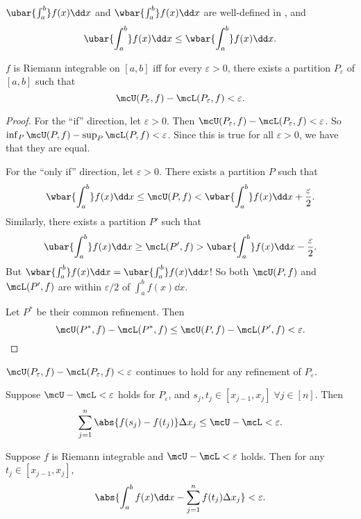 \begin{corollary}
    $\ubar{\int_a^b} f(x) \dd x$ and $\wbar{\int_a^b} f(x) \dd x$
    are well-defined in \R, and \[
        \ubar{\int_a^b} f(x) \dd x \le \wbar{\int_a^b} f(x) \dd x.
    \]
\end{corollary}

\begin{theorem*}
    $f$ is Riemann integrable on $[a, b]$ iff for every $\varepsilon > 0$,
    there exists a partition $P_\varepsilon$ of $[a, b]$ such that \[
        \mcU(P_\varepsilon, f) - \mcL(P_\varepsilon, f) < \varepsilon.
    \]
\end{theorem*}
\begin{proof}
    For the ``if'' direction, let $\varepsilon > 0$.
    Then $\mcU(P_\varepsilon, f) - \mcL(P_\varepsilon, f) < \varepsilon$.
    So $\inf_P \mcU(P, f) - \sup_P \mcL(P, f) < \varepsilon$.
    Since this is true for all $\varepsilon > 0$, we have that they are
    equal.

    For the ``only if'' direction, let $\varepsilon > 0$.
    There exists a partition $P$ such that \[
        \wbar{\int_a^b} f(x) \dd x
            \le \mcU(P, f)
            < \wbar{\int_a^b} f(x) \dd x + \frac{\varepsilon}{2}.
    \] Similarly, there exists a partition $P'$ such that \[
        \ubar{\int_a^b} f(x) \dd x
            \ge \mcL(P', f)
            > \ubar{\int_a^b} f(x) \dd x - \frac{\varepsilon}{2}.
    \] But $\wbar{\int_a^b} f(x) \dd x = \ubar{\int_a^b} f(x) \dd x$!
    So both $\mcU(P, f)$ and $\mcL(P', f)$ are within $\varepsilon/2$ of
    $\int_a^b f(x) \dd x$.

    Let $P^*$ be their common refinement.
    Then \[
        \mcU(P^*, f) - \mcL(P^*, f)
            \le \mcU(P, f) - \mcL(P', f)
            < \varepsilon. \qedhere
    \]
\end{proof}

\begin{remarks}
    \item $\mcU(P_\varepsilon, f) - \mcL(P_\varepsilon, f) < \varepsilon$
    continues to hold for any refinement of $P_\varepsilon$.
    \item Suppose $\mcU - \mcL < \varepsilon$ holds for $P_\varepsilon$,
    and $s_j, t_j \in [x_{j-1}, x_j] \;\forall j \in [n]$.
    Then \[
        \sum_{j=1}^n \abs{f(s_j) - f(t_j)} \Delta x_j
            \le \mcU - \mcL
            < \varepsilon.
    \]
    \item Suppose $f$ is Riemann integrable and $\mcU - \mcL < \varepsilon$
    holds.
    Then for any $t_j \in [x_{j-1}, x_j]$, \[
        \abs{\int_a^b f(x) \dd x - \sum_{j=1}^n f(t_j) \Delta x_j}
            < \varepsilon.
    \]
\end{remarks}

